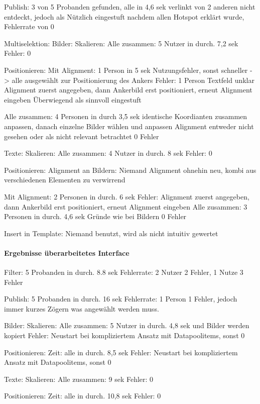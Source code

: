 Publish: 3 von 5 Probanden gefunden, alle in 4,6 sek verlinkt
von 2 anderen nicht entdeckt, jedoch als Nützlich eingestuft
nachdem allen Hotspot erklärt wurde, Fehlerrate von 0

Multiselektion:
Bilder:
	Skalieren:
		Alle zusammen: 5 Nutzer in durch. 7,2 sek
		Fehler: 0

	Positionieren:
		Mit Alignment: 1 Person in 5 sek
			Nutzungsfehler, sonst schneller -> alle ausgewählt zur Positionierung des Ankers
			Fehler: 1 Person Textfeld unklar
				 Alignment zuerst angegeben, dann Ankerbild erst positioniert, erneut Alignment eingeben
			Überwiegend als sinnvoll eingestuft

		Alle zusammen: 4 Personen in durch 3,5 sek
			identische Koordianten zusammen anpassen, danach einzelne Bilder wählen und anpassen
			Alignment entweder nicht gesehen oder als nicht relevant betrachtet
			0 Fehler

Texte:
	Skalieren:
		Alle zusammen: 4 Nutzer in durch. 8 sek
		Fehler: 0

	Positionieren:
		Alignment an Bildern: Niemand
			Alignment ohnehin neu, kombi aus verschiedenen Elementen zu verwirrend
		
		Mit Alignment: 2 Personen in durch. 6 sek
			Fehler: Alignment zuerst angegeben, dann Ankerbild erst positioniert, erneut Alignment eingeben
		Alle zusammen: 3 Personen in durch. 4,6 sek
			Gründe wie bei Bildern
		0 Fehler


Insert in Template: Niemand benutzt, wird als nicht intuitiv gewertet

\paragraph{Ergebnisse überarbeitetes Interface}
Filter: 5 Probanden in durch. 8.8 sek
Fehlerrate: 2 Nutzer 2 Fehler, 1 Nutze 3 Fehler

Publish: 5 Probanden in durch. 16 sek
Fehlerrate: 1 Person 1 Fehler, jedoch immer kurzes Zögern was angewählt werden muss.

Bilder:
	Skalieren:
		Alle zusammen: 5 Nutzer in durch. 4,8 sek und Bilder werden kopiert
		Fehler: Neustart bei kompliziertem Ansatz mit Datapoolitems, sonst 0

	Positionieren:
		Zeit: alle in durch. 8,5 sek
		Fehler: Neustart bei kompliziertem Ansatz mit Datapoolitems, sonst 0

Texte:
	Skalieren:
		Alle zusammen: 9 sek
		Fehler: 0

	Positionieren:
		Zeit: alle in durch. 10,8 sek
		Fehler: 0


